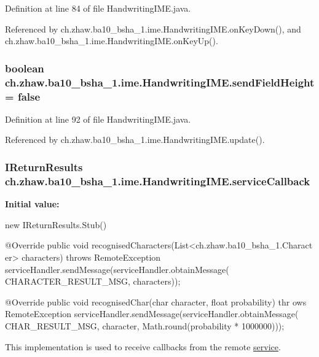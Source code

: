 Definition at line 84 of file HandwritingIME.java.

Referenced by ch.zhaw.ba10\_\-bsha\_\-1.ime.HandwritingIME.onKeyDown(), and ch.zhaw.ba10\_\-bsha\_\-1.ime.HandwritingIME.onKeyUp().\hypertarget{classch_1_1zhaw_1_1ba10__bsha__1_1_1ime_1_1HandwritingIME_a25083961cde3a46e105a3ad13c0f557b}{
\subsubsection[{sendFieldHeight}]{\setlength{\rightskip}{0pt plus 5cm}boolean {\bf ch.zhaw.ba10\_\-bsha\_\-1.ime.HandwritingIME.sendFieldHeight} = false}}
\label{classch_1_1zhaw_1_1ba10__bsha__1_1_1ime_1_1HandwritingIME_a25083961cde3a46e105a3ad13c0f557b}


Definition at line 92 of file HandwritingIME.java.

Referenced by ch.zhaw.ba10\_\-bsha\_\-1.ime.HandwritingIME.update().\hypertarget{classch_1_1zhaw_1_1ba10__bsha__1_1_1ime_1_1HandwritingIME_a2b00011a3695bc66257dd90aa0ac27ab}{
\subsubsection[{serviceCallback}]{\setlength{\rightskip}{0pt plus 5cm}IReturnResults {\bf ch.zhaw.ba10\_\-bsha\_\-1.ime.HandwritingIME.serviceCallback}}}
\label{classch_1_1zhaw_1_1ba10__bsha__1_1_1ime_1_1HandwritingIME_a2b00011a3695bc66257dd90aa0ac27ab}
{\bfseries Initial value:}
\begin{DoxyCode}
 new IReturnResults.Stub() {
                @Override
                public void recognisedCharacters(List<ch.zhaw.ba10_bsha_1.Charact
      er> characters) throws RemoteException {
                        serviceHandler.sendMessage(serviceHandler.obtainMessage(
      CHARACTER_RESULT_MSG, characters));
                }

                @Override
                public void recognisedChar(char character, float probability) thr
      ows RemoteException {
                        serviceHandler.sendMessage(serviceHandler.obtainMessage(
      CHAR_RESULT_MSG, character, Math.round(probability * 1000000)));
                }
    }
\end{DoxyCode}
This implementation is used to receive callbacks from the remote \hyperlink{namespacech_1_1zhaw_1_1ba10__bsha__1_1_1service}{service}. 


